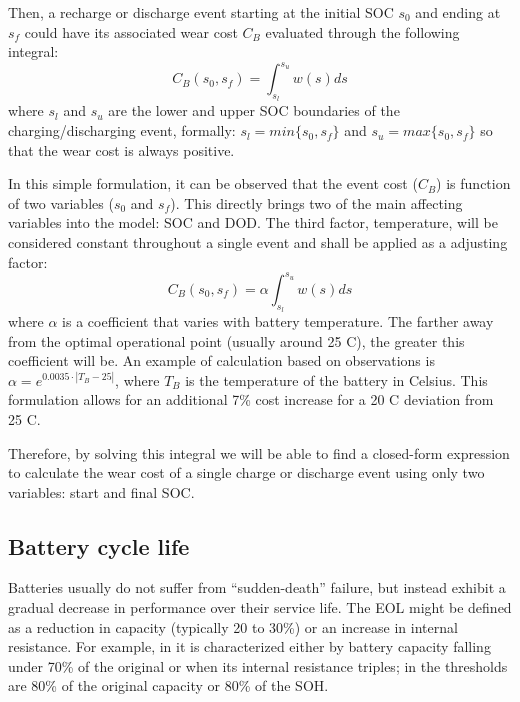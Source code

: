 \documentclass{ieeeaccess}
\begin{document}
    Then, a recharge or discharge event starting at the initial \ac{SOC} $s_{0}$ and ending at $s_{f}$ could have its associated wear cost $C_B$ evaluated through the following integral:
    $$ C_B(s_{0}, s_{f}) = \int_{s_{l}}^{s_{u}}w(s)ds $$
    where $s_{l}$ and $s_{u}$ are the lower and upper \ac{SOC} boundaries of the charging/discharging event, formally: $s_{l} = min\{s_{0}, s_{f}\}$ and $s_{u} = max\{s_{0}, s_{f}\}$ so that the wear cost is always positive.

    In this simple formulation, it can be observed that the event cost ($C_B$) is function of two variables ($s_0$ and $s_f$). This directly brings two of the main affecting variables into the model: \ac{SOC} and \ac{DOD}. The third factor, temperature, will be considered constant throughout a single event and shall be applied as a adjusting factor:
    \begin{equation}
    	C_B(s_{0}, s_{f}) = \alpha \int_{s_{l}}^{s_{u}}w(s)ds
    	\label{eq:Cb(s0,sf)}
    \end{equation}
	where $\alpha$ is a coefficient that varies with battery temperature. The farther away from the optimal operational point (usually around 25 \textdegree C), the greater this coefficient will be. An example of calculation based on observations is $\alpha = e^{0.0035 \cdot |T_B - 25|}$, where $T_B$ is the temperature of the battery in Celsius. This formulation allows for an additional 7\% cost increase for a 20 \textdegree  C deviation from 25 \textdegree C.

	Therefore, by solving this integral we will be able to find a closed-form expression to calculate the wear cost of a single charge or discharge event using only two variables: start and final \ac{SOC}.

    \subsection{Battery cycle life}
    Batteries usually do not suffer from ``sudden-death'' failure, but instead exhibit a gradual decrease in performance over their service life. The \ac{EOL} might be defined as a reduction in capacity (typically 20 to 30\%) or an increase in internal resistance. For example, in \cite{ECKER2014} it is characterized either by battery capacity falling under 70\% of the original or when its internal resistance triples; in \cite{NARAYAN2018} the thresholds are 80\% of the original capacity or 80\% of the \ac{SOH}.
\end{document}
